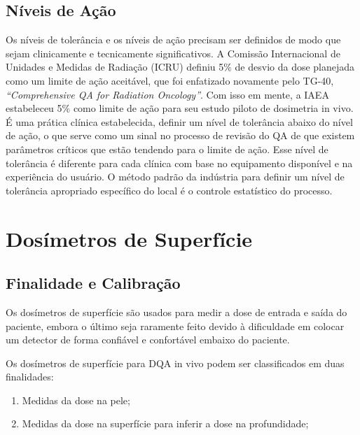 \documentclass[11pt,a4paper]{article}
\begin{document}
\subsection*{Níveis de Ação}

	Os níveis de tolerância e os níveis de ação precisam ser definidos de modo que sejam clinicamente e tecnicamente significativos. A Comissão Internacional de Unidades e Medidas de Radiação (ICRU) definiu 5\% de desvio da dose planejada como um limite de ação aceitável, que foi enfatizado novamente pelo TG-40, \textit{``Comprehensive QA for Radiation Oncology''}. Com isso em mente, a IAEA estabeleceu 5\% como limite de ação para seu estudo piloto de dosimetria in vivo. É uma prática clínica estabelecida, definir um nível de tolerância abaixo do nível de ação, o que serve como um sinal no processo de revisão do QA de que existem parâmetros críticos que estão tendendo para o limite de ação. Esse nível de tolerância é diferente para cada clínica com base no equipamento disponível e na experiência do usuário. O método padrão da indústria para definir um nível de tolerância apropriado específico do local é o controle estatístico do processo.

\section{Dosímetros de Superfície}

\subsection*{Finalidade e Calibração}

	Os dosímetros de superfície são usados para medir a dose de entrada e saída do paciente, embora o último seja raramente feito devido à dificuldade em colocar um detector de forma confiável e confortável embaixo do paciente.

	Os dosímetros de superfície para DQA in vivo podem ser classificados em duas finalidades:

	\begin{enumerate}[label=\textcolor{CarnationPink}{\arabic*${}^\circ $}]
		\item Medidas da dose na pele;
		\item Medidas da dose na superfície para inferir a dose na profundidade;
	\end{enumerate}
\end{document}

